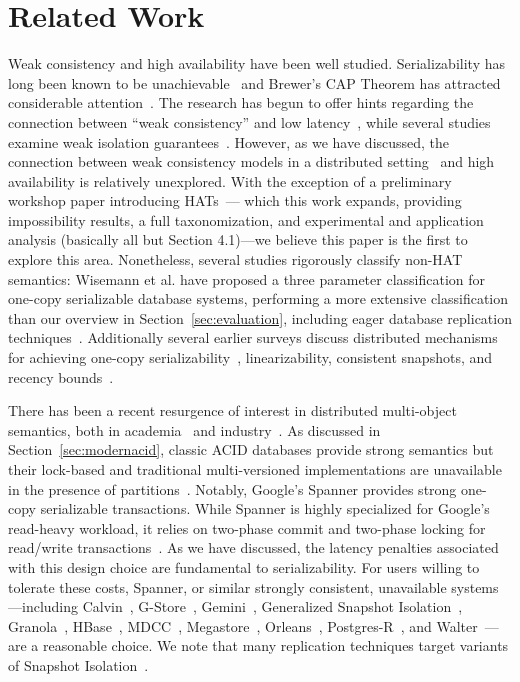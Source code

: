 
\section{Related Work}

Weak consistency and high availability have been well
studied. Serializability has long been known to be
unachievable~\cite{davidson-survey} and Brewer's CAP Theorem has
attracted considerable attention~\cite{gilbert-cap}. The research has
begun to offer hints regarding the connection between ``weak
consistency'' and low latency~\cite{abadi-pacelc}, while several
studies examine weak isolation guarantees~\cite{adya,
  ansicritique}. However, as we have discussed, the connection between
weak consistency models in a distributed setting~\cite{calm, crdt} and
high availability is relatively unexplored. With the exception of a
preliminary workshop paper introducing HATs~\cite{hat-hotos}--- which
this work expands, providing impossibility results, a full
taxonomization, and experimental and application analysis (basically
all but Section 4.1)---we believe this paper is the first to explore
this area. Nonetheless, several studies rigorously classify non-HAT
semantics: Wisemann et al. have proposed a three parameter
classification for one-copy serializable database systems, performing
a more extensive classification than our overview in
Section~\ref{sec:evaluation}, including eager database replication
techniques~\cite{kemme-classification}. Additionally several earlier
surveys discuss distributed mechanisms for achieving one-copy
serializability~\cite{wisemann-survey}, linearizability, consistent
snapshots, and recency bounds~\cite{ceri-mechanism, chen-mechanism}.

There has been a recent resurgence of interest in distributed
multi-object semantics, both in academia~\cite{kraska-s3, granola,
  gstore, mdcc, redblue, cops, eiger, walter,calvin, swift} and
industry~\cite{megastore, orleans, spanner}. As discussed in
Section~\ref{sec:modernacid}, classic ACID databases provide strong
semantics but their lock-based and traditional multi-versioned
implementations are unavailable in the presence of
partitions~\cite{bernstein-concurrency, bernstein-book,
  gray-isolation}. Notably, Google's Spanner provides strong one-copy
serializable transactions. While Spanner is highly specialized for
Google's read-heavy workload, it relies on two-phase commit and
two-phase locking for read/write transactions~\cite{spanner}. As we
have discussed, the latency penalties associated with this design
choice are fundamental to serializability. For users willing to
tolerate these costs, Spanner, or similar strongly consistent,
unavailable systems---including Calvin~\cite{calvin},
G-Store~\cite{gstore}, Gemini~\cite{redblue}, Generalized Snapshot
Isolation~\cite{generalizedsnapshot}, Granola~\cite{granola},
HBase~\cite{hbase}, MDCC~\cite{mdcc}, Megastore~\cite{megastore},
Orleans~\cite{orleans}, Postgres-R~\cite{kemme-thesis}, and
Walter~\cite{walter}---are a reasonable choice. We note that many
replication techniques target variants of Snapshot
Isolation~\cite{middleware-db}.

